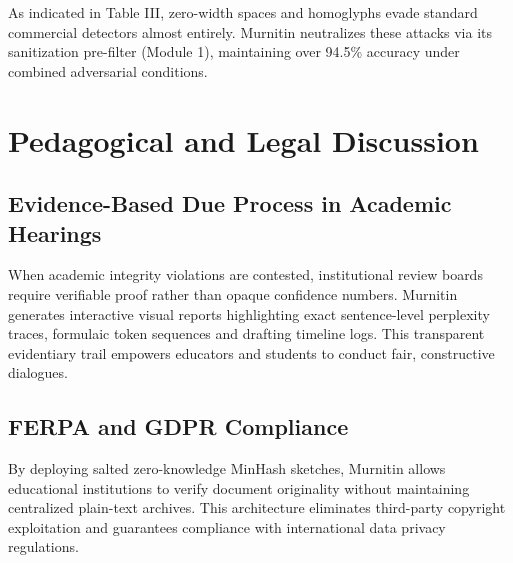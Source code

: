 \documentclass[conference]{IEEEtran}
\begin{document}
\begin{table}[htbp]
\caption{Detection Accuracy Under Adversarial Attacks}
\begin{center}
\label{tab_adv}
\end{center}
\end{table}

As indicated in Table III, zero-width spaces and homoglyphs evade standard commercial detectors almost entirely. Murnitin neutralizes these attacks via its sanitization pre-filter (Module 1), maintaining over 94.5\% accuracy under combined adversarial conditions.

\section{Pedagogical and Legal Discussion}

\subsection{Evidence-Based Due Process in Academic Hearings}
When academic integrity violations are contested, institutional review boards require verifiable proof rather than opaque confidence numbers. Murnitin generates interactive visual reports highlighting exact sentence-level perplexity traces, formulaic token sequences and drafting timeline logs. This transparent evidentiary trail empowers educators and students to conduct fair, constructive dialogues.

\subsection{FERPA and GDPR Compliance}
By deploying salted zero-knowledge MinHash sketches, Murnitin allows educational institutions to verify document originality without maintaining centralized plain-text archives. This architecture eliminates third-party copyright exploitation and guarantees compliance with international data privacy regulations.
\end{document}

